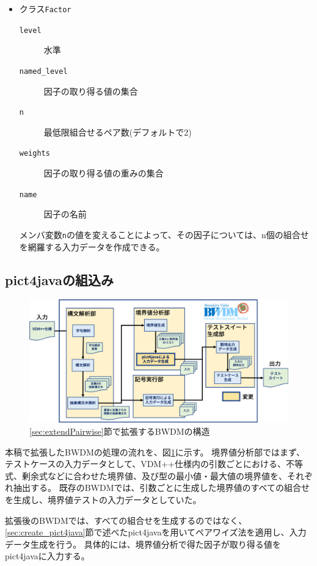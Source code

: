 \documentclass[uplatex, report, a4j, 10pt]{jsbook}
\newcommand\ttt[1]{\texttt{#1}}
\begin{document}
\begin{itemize}
\begin{description}
        \end{description}
  \item クラス\ttt{Factor}
        \begin{description}
          \item[\ttt{level}] 水準
          \item[\ttt{named\_level}] 因子の取り得る値の集合
          \item[\ttt{n}] 最低限組合せるペア数(デフォルトで2)
          \item[\ttt{weights}] 因子の取り得る値の重みの集合
          \item[\ttt{name}] 因子の名前
        \end{description}
        メンバ変数\ttt{n}の値を変えることによって、その因子については、n個の組合せを網羅する入力データを作成できる。
\end{itemize}

\subsection{pict4javaの組込み}
\begin{figure}[tp]
  \centering
  \includegraphics[keepaspectratio, width=160mm]{figs/pict4java_embed}
  \caption{\ref{sec:extendPairwise}節で拡張するBWDMの構造}
  \label{fig:pict4javaEmbed}
\end{figure}

本稿で拡張したBWDMの処理の流れを、図\ref{fig:pict4javaEmbed}に示す。
境界値分析部ではまず、テストケースの入力データとして、VDM++仕様内の引数ごとにおける、不等式、剰余式などに合わせた境界値、及び型の最小値・最大値の境界値を、それぞれ抽出する。
既存のBWDMでは、引数ごとに生成した境界値のすべての組合せを生成し、境界値テストの入力データとしていた。

拡張後のBWDMでは、すべての組合せを生成するのではなく、\ref{sec:create_pict4java}節で述べたpict4javaを用いてペアワイズ法を適用し、入力データ生成を行う。
具体的には、境界値分析で得た因子が取り得る値をpict4javaに入力する。
\end{document}
